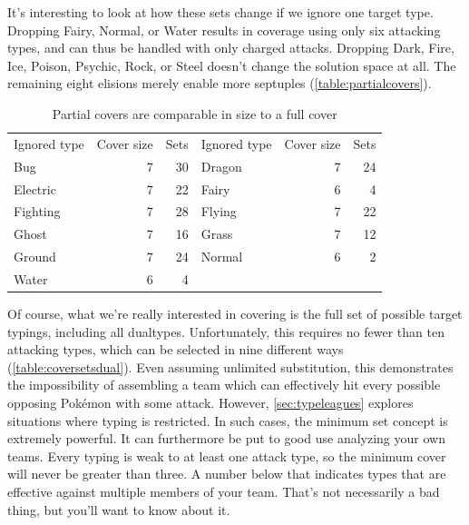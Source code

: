 It's interesting to look at how these sets change if we ignore one target type.
Dropping Fairy, Normal, or Water results in coverage using only six attacking types,
  and can thus be handled with only charged attacks.
Dropping Dark, Fire, Ice, Poison, Psychic, Rock, or Steel doesn't change the solution space at all.
The remaining eight elisions merely enable more septuples (\autoref{table:partialcovers}).
\begin{table}
\centering
  \begin{tabular}{lrr|lrr}
    Ignored type & Cover size & Sets & Ignored type & Cover size & Sets\\
    \Midrule
    Bug & 7 & 30 & Dragon & 7 & 24\\
    Electric & 7 & 22 & Fairy & 6 & 4\\
    Fighting & 7 & 28 & Flying & 7 & 22\\
    Ghost & 7 & 16 & Grass & 7 & 12\\
    Ground & 7 & 24 & Normal & 6 & 2\\
    Water & 6 & 4 & & & \\
  \end{tabular}
  \caption{Partial covers are comparable in size to a full cover\label{table:partialcovers}}
\end{table}

Of course, what we're really interested in covering is the full set
  of possible target typings, including all dualtypes.
Unfortunately, this requires no fewer than ten attacking types,
  which can be selected in nine different ways (\autoref{table:coversetsdual}).
Even assuming unlimited substitution, this demonstrates the
  impossibility of assembling a team which can effectively
  hit every possible opposing Pokémon with some attack.
However, \autoref{sec:typeleagues} explores situations where typing is restricted.
In such cases, the minimum set concept is extremely powerful.
It can furthermore be put to good use analyzing your own teams.
Every typing is weak to at least one attack type, so the minimum
 cover will never be greater than three.
A number below that indicates types that are effective against
 multiple members of your team.
That's not necessarily a bad thing, but you'll want to know about it.

